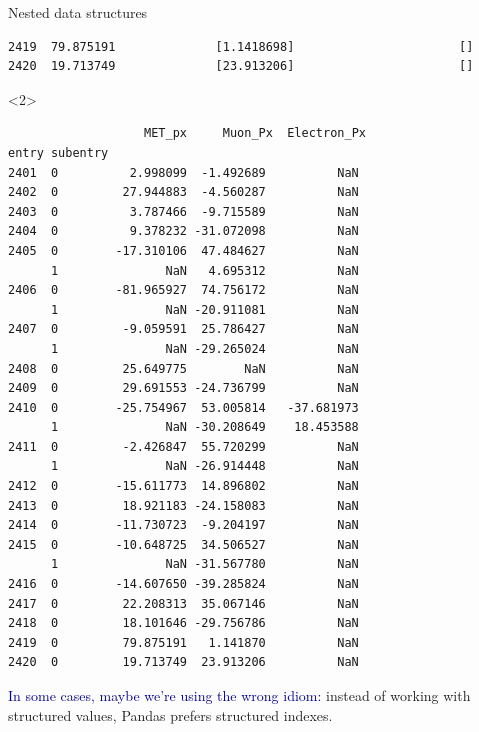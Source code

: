 \documentclass[aspectratio=169]{beamer}
\begin{document}
\begin{frame}[fragile]{Nested data structures}
\begin{onlyenv}
\begin{verbatim}
2419  79.875191              [1.1418698]                       []
2420  19.713749              [23.913206]                       []
\end{verbatim}
\vspace{1.7 cm}
\end{onlyenv}\begin{onlyenv}<2>\begin{verbatim}
                   MET_px     Muon_Px  Electron_Px
entry subentry
2401  0          2.998099  -1.492689          NaN
2402  0         27.944883  -4.560287          NaN
2403  0          3.787466  -9.715589          NaN
2404  0          9.378232 -31.072098          NaN
2405  0        -17.310106  47.484627          NaN
      1               NaN   4.695312          NaN
2406  0        -81.965927  74.756172          NaN
      1               NaN -20.911081          NaN
2407  0         -9.059591  25.786427          NaN
      1               NaN -29.265024          NaN
2408  0         25.649775        NaN          NaN
2409  0         29.691553 -24.736799          NaN
2410  0        -25.754967  53.005814   -37.681973
      1               NaN -30.208649    18.453588
2411  0         -2.426847  55.720299          NaN
      1               NaN -26.914448          NaN
2412  0        -15.611773  14.896802          NaN
2413  0         18.921183 -24.158083          NaN
2414  0        -11.730723  -9.204197          NaN
2415  0        -10.648725  34.506527          NaN
      1               NaN -31.567780          NaN
2416  0        -14.607650 -39.285824          NaN
2417  0         22.208313  35.067146          NaN
2418  0         18.101646 -29.756786          NaN
2419  0         79.875191   1.141870          NaN
2420  0         19.713749  23.913206          NaN
\end{verbatim}
\end{onlyenv}

\vspace{-5 cm}
\hfill \begin{minipage}{0.33\linewidth}
\large
\textcolor{darkblue}{In some cases, maybe we're using the wrong idiom:} instead of working with structured values, Pandas prefers structured indexes.
\end{minipage}
\vspace{5 cm}
\end{frame}
\end{document}
